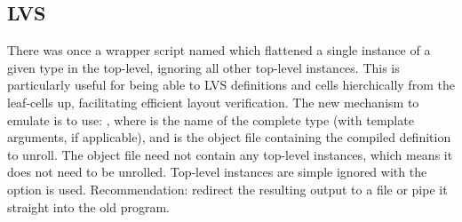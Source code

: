\subsection{LVS}
\label{sec:tools:lvs}

There was once a wrapper script named  which 
flattened a single instance of a given type in the top-level, 
ignoring all other top-level instances.  
This is particularly useful for being able to LVS definitions and cells
hierchically from the leaf-cells up, facilitating efficient 
layout verification.  
The new mechanism to emulate  is to use:
, 
where  is the name of the complete type
(with template arguments, if applicable), and  is the object file
containing the compiled definition to unroll.  
The object file need not contain any top-level instances, 
which means it does not need to be unrolled.  
Top-level instances are simple ignored with the  option is used.  
Recommendation: redirect the resulting output to a  file
or pipe it straight into the old  program.  

